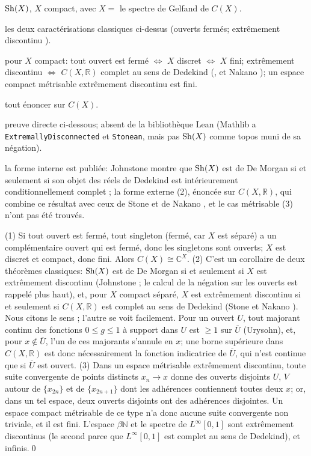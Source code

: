 \begin{trace}
\item[tablier] $\mathrm{Sh}(X)$, $X$ compact, avec $X = $ le spectre de Gelfand de $C(X)$.
\item[arche] les deux caractérisations classiques ci-dessus (ouverts fermés; extrêmement discontinu \cite{johnstone-demorgan}).
\item[spécialiser] pour $X$ compact: tout ouvert est fermé $\iff$ $X$ discret $\iff$ $X$ fini; extrêmement discontinu $\iff$ $C(X,\mathbb R)$ complet au sens de Dedekind (\cite[Th.~14]{stone-bounded}, et Nakano \cite{nakano}); un espace compact métrisable extrêmement discontinu est fini.
\item[réécrire] tout énoncer sur $C(X)$.
\item[vérifier] preuve directe ci-dessous; absent de la bibliothèque Lean (Mathlib a \texttt{ExtremallyDisconnected} et \texttt{Stonean}, mais pas $\mathrm{Sh}(X)$ comme topos muni de sa négation).
\item[nouveauté] la forme interne est publiée: Johnstone montre que $\mathrm{Sh}(X)$ est de De Morgan si et seulement si son objet des réels de Dedekind est intérieurement conditionnellement complet \cite{johnstone-demorgan}; la forme externe (2), énoncée sur $C(X,\mathbb R)$, qui combine ce résultat avec ceux de Stone et de Nakano \cite{stone-bounded,nakano}, et le cas métrisable (3) n'ont pas été trouvés.
\end{trace}

\direct{} (1) Si tout ouvert est fermé, tout singleton (fermé, car $X$ est séparé) a un complémentaire ouvert qui est fermé, donc les singletons sont ouverts; $X$ est discret et compact, donc fini. Alors $C(X)\cong\mathbb C^{X}$. (2) C'est un corollaire de deux théorèmes classiques: $\mathrm{Sh}(X)$ est de De Morgan si et seulement si $X$ est extrêmement discontinu (Johnstone \cite{johnstone-demorgan}; le calcul de la négation sur les ouverts est rappelé plus haut), et, pour $X$ compact séparé, $X$ est extrêmement discontinu si et seulement si $C(X,\mathbb R)$ est complet au sens de Dedekind (Stone \cite[Th.~14]{stone-bounded} et Nakano \cite{nakano}). Nous citons le sens ; l'autre se voit facilement. Pour un ouvert $U$, tout majorant continu des fonctions $0\le g\le 1$ à support dans $U$ est $\ge 1$ sur $\overline U$ (Urysohn), et, pour $x\notin\overline U$, l'un de ces majorants s'annule en $x$; une borne supérieure dans $C(X,\mathbb R)$ est donc nécessairement la fonction indicatrice de $\overline U$, qui n'est continue que si $\overline U$ est ouvert. (3) Dans un espace métrisable extrêmement discontinu, toute suite convergente de points distincts $x_n\to x$ donne des ouverts disjoints $U$, $V$ autour de $\{x_{2n}\}$ et de $\{x_{2n+1}\}$ dont les adhérences contiennent toutes deux $x$; or, dans un tel espace, deux ouverts disjoints ont des adhérences disjointes. Un espace compact métrisable de ce type n'a donc aucune suite convergente non triviale, et il est fini. L'espace $\beta\mathbb N$ et le spectre de $L^\infty[0,1]$ sont extrêmement discontinus (le second parce que $L^\infty[0,1]$ est complet au sens de Dedekind), et infinis.\qed

